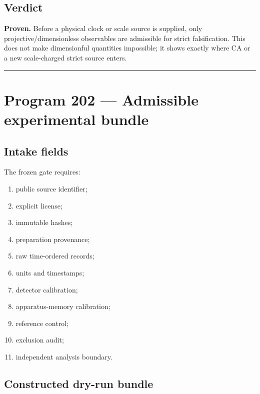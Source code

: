 \documentclass[11pt,a4paper,openany]{report}
\begin{document}
\section{Verdict}

\textbf{Proven.} Before a physical clock or scale source is supplied, only projective/\allowbreak{}dimensionless observables are admissible for strict falsification. This does not make dimensionful quantities impossible; it shows exactly where CA or a new scale-charged strict source enters.

\par\medskip\hrule\medskip

\chapter{Program 202 --- Admissible experimental bundle}

\section{Intake fields}

The frozen gate requires:

\begin{enumerate}
\item 
public source identifier;

\item 
explicit license;

\item 
immutable hashes;

\item 
preparation provenance;

\item 
raw time-ordered records;

\item 
units and timestamps;

\item 
detector calibration;

\item 
apparatus-memory calibration;

\item 
reference control;

\item 
exclusion audit;

\item 
independent analysis boundary.

\end{enumerate}

\section{Constructed dry-run bundle}
\end{document}
